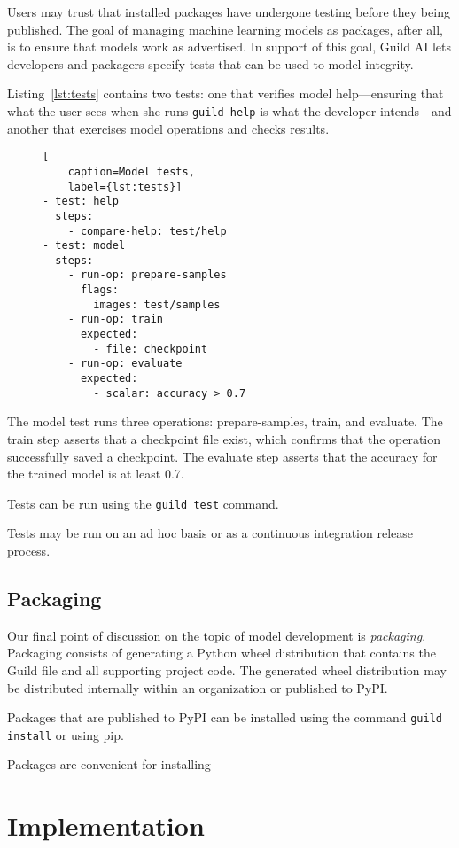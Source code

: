 \documentclass{article}
\begin{document}
Users may trust that installed packages have undergone testing before
they being published. The goal of managing machine learning models as
packages, after all, is to ensure that models work as advertised. In
support of this goal, Guild AI lets developers and packagers specify
tests that can be used to model integrity.

Listing~\ref{lst:tests} contains two tests: one that verifies model
help---ensuring that what the user sees when she runs
\verb|guild help| is what the developer intends---and another that
exercises model operations and checks results.

\begin{figure}
\begin{lstlisting}[
    caption=Model tests,
    label={lst:tests}]
- test: help
  steps:
    - compare-help: test/help
- test: model
  steps:
    - run-op: prepare-samples
      flags:
        images: test/samples
    - run-op: train
      expected:
        - file: checkpoint
    - run-op: evaluate
      expected:
        - scalar: accuracy > 0.7
\end{lstlisting}
\end{figure}

The model test runs three operations: prepare-samples, train, and
evaluate. The train step asserts that a checkpoint file exist, which
confirms that the operation successfully saved a checkpoint. The
evaluate step asserts that the accuracy for the trained model is at
least 0.7.

Tests can be run using the \verb|guild test| command.

Tests may be run on an ad hoc basis or as a continuous integration
release process.

\subsection{Packaging}

Our final point of discussion on the topic of model development is
\emph{packaging}. Packaging consists of generating a Python wheel
distribution that contains the Guild file and all supporting project
code. The generated wheel distribution may be distributed internally
within an organization or published to PyPI.

Packages that are published to PyPI can be installed using the command
\verb|guild install| or using pip.

Packages are convenient for installing

\section{Implementation}
\end{document}
